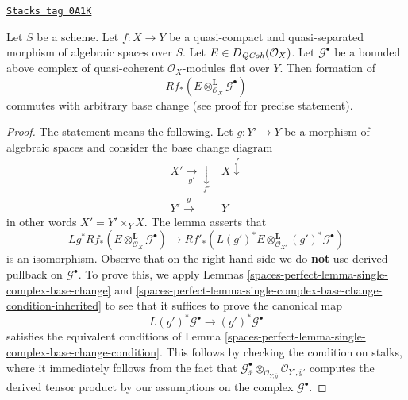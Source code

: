 \begin{lemma}
\label{spaces-perfect-lemma-base-change-tensor}
\href{https://stacks.math.columbia.edu/tag/0A1K}{\texttt{Stacks tag 0A1K}}

Let $S$ be a scheme. Let $f : X \to Y$ be a quasi-compact and
quasi-separated morphism of algebraic spaces over $S$.
Let $E \in D_{\mathit{QCoh}}(\mathcal{O}_X)$.
Let $\mathcal{G}^\bullet$ be a bounded above complex of
quasi-coherent $\mathcal{O}_X$-modules flat over $Y$.
Then formation of
$$
Rf_*(E \otimes^\mathbf{L}_{\mathcal{O}_X} \mathcal{G}^\bullet)
$$
commutes with arbitrary base change (see proof for precise statement).
\end{lemma}

\begin{proof}
The statement means the following. Let $g : Y' \to Y$ be a morphism of
algebraic spaces and consider the base change diagram
$$
\begin{array}{cc}X' \underset{g'}{\longrightarrow}\underset{f'}{\downarrow} & X \overset{f}{\downarrow} \\ Y' \overset{g}{\longrightarrow} & Y\end{array}
$$
in other words $X' = Y' \times_Y X$. The lemma asserts that
$$
Lg^*Rf_*(E \otimes^\mathbf{L}_{\mathcal{O}_X} \mathcal{G}^\bullet)
\longrightarrow
Rf'_*(L(g')^*E \otimes^\mathbf{L}_{\mathcal{O}_{X'}} (g')^*\mathcal{G}^\bullet)
$$
is an isomorphism. Observe that on the right hand side we do {\bf not}
use derived pullback on $\mathcal{G}^\bullet$.
To prove this, we apply Lemmas \ref{spaces-perfect-lemma-single-complex-base-change} and
\ref{spaces-perfect-lemma-single-complex-base-change-condition-inherited} to see that it
suffices to prove the canonical map
$$
L(g')^*\mathcal{G}^\bullet \to (g')^*\mathcal{G}^\bullet
$$
satisfies the equivalent conditions of
Lemma \ref{spaces-perfect-lemma-single-complex-base-change-condition}.
This follows by checking the condition on stalks, where it
immediately follows from the fact that
$\mathcal{G}^\bullet_{\overline{x}}
\otimes_{\mathcal{O}_{Y, \overline{y}}}
\mathcal{O}_{Y', \overline{y}'}$
computes the derived tensor product by our assumptions on the complex
$\mathcal{G}^\bullet$.
\end{proof}

